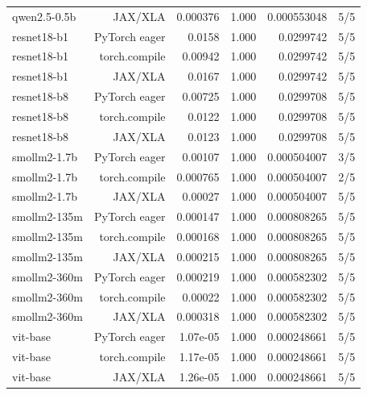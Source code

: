 \begin{tabular}{lrrrrr}
qwen2.5-0.5b & JAX/XLA & 0.000376 & 1.000 & 0.000553048 & 5/5 \\
resnet18-b1 & PyTorch eager & 0.0158 & 1.000 & 0.0299742 & 5/5 \\
resnet18-b1 & torch.compile & 0.00942 & 1.000 & 0.0299742 & 5/5 \\
resnet18-b1 & JAX/XLA & 0.0167 & 1.000 & 0.0299742 & 5/5 \\
resnet18-b8 & PyTorch eager & 0.00725 & 1.000 & 0.0299708 & 5/5 \\
resnet18-b8 & torch.compile & 0.0122 & 1.000 & 0.0299708 & 5/5 \\
resnet18-b8 & JAX/XLA & 0.0123 & 1.000 & 0.0299708 & 5/5 \\
smollm2-1.7b & PyTorch eager & 0.00107 & 1.000 & 0.000504007 & 3/5 \\
smollm2-1.7b & torch.compile & 0.000765 & 1.000 & 0.000504007 & 2/5 \\
smollm2-1.7b & JAX/XLA & 0.00027 & 1.000 & 0.000504007 & 5/5 \\
smollm2-135m & PyTorch eager & 0.000147 & 1.000 & 0.000808265 & 5/5 \\
smollm2-135m & torch.compile & 0.000168 & 1.000 & 0.000808265 & 5/5 \\
smollm2-135m & JAX/XLA & 0.000215 & 1.000 & 0.000808265 & 5/5 \\
smollm2-360m & PyTorch eager & 0.000219 & 1.000 & 0.000582302 & 5/5 \\
smollm2-360m & torch.compile & 0.00022 & 1.000 & 0.000582302 & 5/5 \\
smollm2-360m & JAX/XLA & 0.000318 & 1.000 & 0.000582302 & 5/5 \\
vit-base & PyTorch eager & 1.07e-05 & 1.000 & 0.000248661 & 5/5 \\
vit-base & torch.compile & 1.17e-05 & 1.000 & 0.000248661 & 5/5 \\
vit-base & JAX/XLA & 1.26e-05 & 1.000 & 0.000248661 & 5/5 \\
\bottomrule
\end{tabular}
